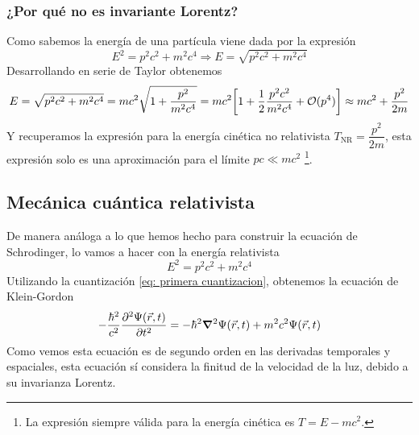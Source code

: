 \subsubsection{¿Por qué no es invariante Lorentz?}
Como sabemos la energía de una partícula viene dada por la expresión
\begin{equation}
    E^2=p^2c^2+m^2c^4 \Rightarrow E=\sqrt{p^2c^2+m^2c^4}
    \label{eq: Energia relativista}
\end{equation}
Desarrollando en serie de Taylor obtenemos
\begin{equation}
    E=\sqrt{p^2c^2+m^2c^4}=mc^2 \sqrt{1+\frac{p^2}{m^2c^4}}= mc^2 \qty[1+\frac{1}{2} \frac{p^2 c^2}{m^2c^4}+\mathcal{O}(p^4)]\approx mc^2+\frac{p^2}{2m}
\end{equation}
Y recuperamos la expresión para la energía cinética no relativista $T_\mathrm{NR}=\dfrac{p^2}{2m}$, esta expresión solo es una aproximación para el límite $pc \ll mc^2$ \footnote{La expresión siempre válida para la energía cinética es $T=E-mc^2$.}.

\subsection{Mecánica cuántica relativista}
De manera análoga a lo que hemos hecho para construir la ecuación de Schrodinger, lo vamos a hacer con la energía relativista 
\begin{equation}
    E^2=p^2c^2+m^2c^4
\end{equation}
Utilizando la cuantización \ref{eq: primera cuantizacion}, obtenemos la ecuación de Klein-Gordon
\begin{equation}
 -\frac{\hbar^2}{c^2}\frac{\partial^2 \Psi(\vec{r},t)}{\partial t^2} = - \hbar^2 \grad^2 \Psi(\vec{r},t) + m^2 c^2 \Psi(\vec{r},t)
 \label{eq: Ecuacion de Klein-Gordon}
\end{equation}
Como vemos esta ecuación es de segundo orden en las derivadas temporales y espaciales, esta ecuación sí considera la finitud de la velocidad de la luz, debido a su invarianza Lorentz. 
